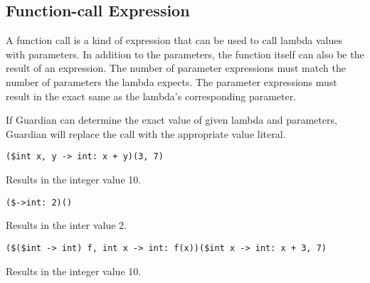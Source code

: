 
\subsection{Function-call Expression}
{
	A function call is a kind of expression that can be used to call
	lambda values with parameters. In addition to the parameters,
	the function itself can also be the result of an expression.
	The number of parameter expressions must match the number of parameters
	the lambda expects. The parameter expressions must result in the
	exact same as the lambda's corresponding parameter.
	
	If Guardian can determine the exact value of given lambda and parameters,
	Guardian
	will replace the call with the appropriate value literal.
	
	\begin{itemize}
	{
		\item \texttt{(\$int x, y -> int: x + y)(3, 7)}
		
			Results in the integer value 10.
		
		\item \texttt{(\$->int: 2)()}
		
			Results in the inter value 2.
		
		\item \texttt{(\$(\$int -> int) f, int x -> int: f(x))(\$int x -> int: x + 3, 7)}
		
			Results in the integer value 10.
	}
	\end{itemize}
}
